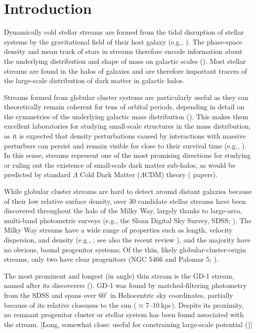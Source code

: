 \documentclass[modern]{aastex62}
\begin{document}

\section{Introduction}
\label{sec:intro}

Dynamically cold stellar streams are formed from the tidal disruption of stellar
systems by the gravitational field of their host galaxy (e.g.,
\citealt{Johnston:1998}).
The phase-space density and mean track of stars in streams therefore encode
information about the underlying distribution and shape of mass on galactic
scales (\citealt{Bonaca:2018}).
Most stellar streams are found in the halos of galaxies and are therefore
important tracers of the large-scale distribution of dark matter in galactic
halos.

Streams formed from globular cluster systems are particularly useful as they can
theoretically remain coherent for tens of orbital periods, depending in detail
on the symmetries of the underlying galactic mass distribution
(\citealt{Erkal:...}).
This makes them excellent laboratories for studying small-scale structures in
the mass distribution, as it is expected that density perturbations caused by
interactions with massive perturbers can persist and remain visible for close to
their survival time (e.g., \citealt{Yoon:2011}).
In this sense, streams represent one of the most promising directions for
studying or ruling out the existence of small-scale dark matter sub-halos, as
would be predicted by standard $\Lambda$ Cold Dark Matter ($\Lambda$CDM) theory
(\citealt{Erkal, Sanders, Bovy} papers).

While globular cluster streams are hard to detect around distant galaxies
because of their low relative surface density, over 30 candidate stellar streams
have been discovered throughout the halo of the Milky Way, largely thanks to
large-area, multi-band photometric surveys (e.g., the Sloan Digital Sky Survey,
SDSS; \citealt{York:2000, TODO}).
The Milky Way streams have a wide range of properties such as length, velocity
dispersion, and density (e.g., \citealt{SoManyPeople,Bonaca:2012}; see also the
recent review \citealt{Grillmair:2016, Newberg:2016}), and the majority have no
obvious, bound progenitor systems; Of the thin, likely globular-cluster-origin
streams, only two have clear progenitors (NGC 5466 and Palomar 5; \citealt{TODO,
TODO}).

The most prominent and longest (in angle) thin stream is the GD-1 stream, named
after its discoverers (\citealt{Grillmair:2006}).
GD-1 was found by matched-filtering photometry from the SDSS and spans over
$60^\circ$ in Heliocentric sky coordinates, partially because of its relative
closeness to the sun ($\approx 7$--$10~\textrm{kpc}$).
Despite its proximity, no remnant progenitor cluster or stellar system has been
found associated with the stream.
[Long, somewhat close: useful for constraining large-scale potential (\citealt{Koposov:2009})]
\end{document}
